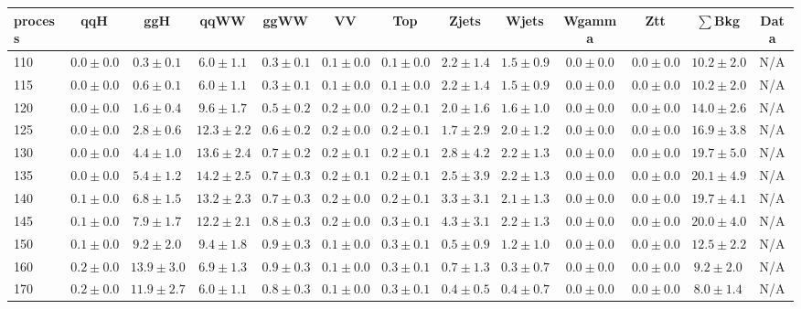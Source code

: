 \begin{table}
{%
 \tiny
 \begin{center}
 \begin{tabular}{l | c c | c c c c c c c c  | c c}
 \hline
 process & qqH & ggH & qqWW & ggWW & VV & Top & Zjets & Wjets & Wgamma & Ztt & $\sum$Bkg & Data \\
 \hline
110 & $0.0\pm0.0$ & $0.3\pm0.1$ & $6.0\pm1.1$ & $0.3\pm0.1$ & $0.1\pm0.0$ & $0.1\pm0.0$ & $2.2\pm1.4$ & $1.5\pm0.9$ & $0.0\pm0.0$ & $0.0\pm0.0$ & $10.2\pm2.0$ & N/A \\ 
115 & $0.0\pm0.0$ & $0.6\pm0.1$ & $6.0\pm1.1$ & $0.3\pm0.1$ & $0.1\pm0.0$ & $0.1\pm0.0$ & $2.2\pm1.4$ & $1.5\pm0.9$ & $0.0\pm0.0$ & $0.0\pm0.0$ & $10.2\pm2.0$ & N/A \\ 
120 & $0.0\pm0.0$ & $1.6\pm0.4$ & $9.6\pm1.7$ & $0.5\pm0.2$ & $0.2\pm0.0$ & $0.2\pm0.1$ & $2.0\pm1.6$ & $1.6\pm1.0$ & $0.0\pm0.0$ & $0.0\pm0.0$ & $14.0\pm2.6$ & N/A \\ 
125 & $0.0\pm0.0$ & $2.8\pm0.6$ & $12.3\pm2.2$ & $0.6\pm0.2$ & $0.2\pm0.0$ & $0.2\pm0.1$ & $1.7\pm2.9$ & $2.0\pm1.2$ & $0.0\pm0.0$ & $0.0\pm0.0$ & $16.9\pm3.8$ & N/A \\ 
130 & $0.0\pm0.0$ & $4.4\pm1.0$ & $13.6\pm2.4$ & $0.7\pm0.2$ & $0.2\pm0.1$ & $0.2\pm0.1$ & $2.8\pm4.2$ & $2.2\pm1.3$ & $0.0\pm0.0$ & $0.0\pm0.0$ & $19.7\pm5.0$ & N/A \\ 
135 & $0.0\pm0.0$ & $5.4\pm1.2$ & $14.2\pm2.5$ & $0.7\pm0.3$ & $0.2\pm0.1$ & $0.2\pm0.1$ & $2.5\pm3.9$ & $2.2\pm1.3$ & $0.0\pm0.0$ & $0.0\pm0.0$ & $20.1\pm4.9$ & N/A \\ 
140 & $0.1\pm0.0$ & $6.8\pm1.5$ & $13.2\pm2.3$ & $0.7\pm0.3$ & $0.2\pm0.0$ & $0.2\pm0.1$ & $3.3\pm3.1$ & $2.1\pm1.3$ & $0.0\pm0.0$ & $0.0\pm0.0$ & $19.7\pm4.1$ & N/A \\ 
145 & $0.1\pm0.0$ & $7.9\pm1.7$ & $12.2\pm2.1$ & $0.8\pm0.3$ & $0.2\pm0.0$ & $0.3\pm0.1$ & $4.3\pm3.1$ & $2.2\pm1.3$ & $0.0\pm0.0$ & $0.0\pm0.0$ & $20.0\pm4.0$ & N/A \\ 
150 & $0.1\pm0.0$ & $9.2\pm2.0$ & $9.4\pm1.8$ & $0.9\pm0.3$ & $0.1\pm0.0$ & $0.3\pm0.1$ & $0.5\pm0.9$ & $1.2\pm1.0$ & $0.0\pm0.0$ & $0.0\pm0.0$ & $12.5\pm2.2$ & N/A \\ 
160 & $0.2\pm0.0$ & $13.9\pm3.0$ & $6.9\pm1.3$ & $0.9\pm0.3$ & $0.1\pm0.0$ & $0.3\pm0.1$ & $0.7\pm1.3$ & $0.3\pm0.7$ & $0.0\pm0.0$ & $0.0\pm0.0$ & $9.2\pm2.0$ & N/A \\ 
170 & $0.2\pm0.0$ & $11.9\pm2.7$ & $6.0\pm1.1$ & $0.8\pm0.3$ & $0.1\pm0.0$ & $0.3\pm0.1$ & $0.4\pm0.5$ & $0.4\pm0.7$ & $0.0\pm0.0$ & $0.0\pm0.0$ & $8.0\pm1.4$ & N/A \\ 

\end{tabular}
\end{center}}
\end{table}
